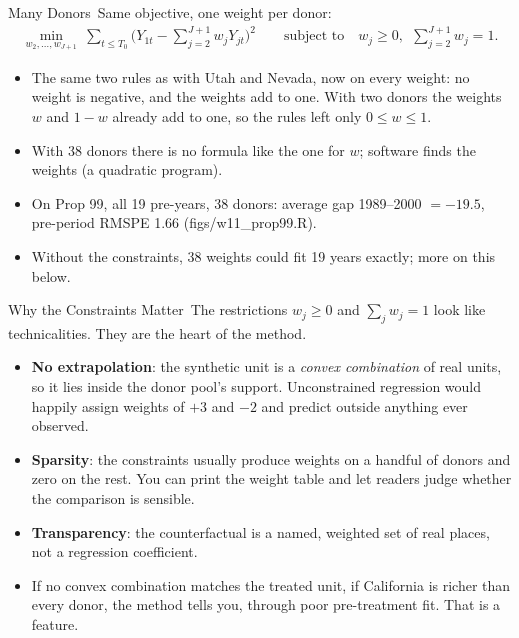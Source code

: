 \documentclass[aspectratio=169,11pt,xcolor=dvipsnames]{beamer}
\newcommand{\srcp}[1]{{\scriptsize\color{gray}(#1)}}
\newcommand{\core}{\,\raisebox{0.6pt}{\textcolor{corestar}{$\bigstar$}}}
\begin{document}
\begin{frame}{Many Donors\core}
Same objective, one weight per donor:
\begin{align*}
  \min_{w_2,\dots,w_{J+1}}\ \sum_{t \leq T_0}\Big(Y_{1t} - \sum_{j=2}^{J+1} w_j Y_{jt}\Big)^2
  \qquad\text{subject to}\quad w_j \geq 0,\ \ \sum_{j=2}^{J+1} w_j = 1 .
\end{align*}
\vskip3pt
\begin{itemize}\itemsep3pt
  \item The same two rules as with Utah and Nevada, now on every weight: no
        weight is negative, and the weights add to one. With two donors the
        weights $w$ and $1-w$ already add to one, so the rules left only
        $0 \leq w \leq 1$.
  \item With 38 donors there is no formula like the one for $w$; software
        finds the weights (a quadratic program).
  \item On Prop 99, all 19 pre-years, 38 donors: average gap 1989--2000 $= -19.5$,
        pre-period RMSPE 1.66 \srcp{figs/w11\_prop99.R}.
  \item Without the constraints, 38 weights could fit 19 years exactly; more on this
        below.
\end{itemize}
\end{frame}

\begin{frame}{Why the Constraints Matter\core}
The restrictions $w_j\geq 0$ and $\sum_j w_j = 1$ look like technicalities. They
are the heart of the method.
\vskip4pt
\begin{itemize}\itemsep3pt
  \item \textbf{No extrapolation}: the synthetic unit is a \emph{convex
        combination} of real units, so it lies inside the donor pool's support.
        Unconstrained regression would happily assign weights of $+3$ and $-2$ and
        predict outside anything ever observed.
  \item \textbf{Sparsity}: the constraints usually produce weights on a handful
        of donors and zero on the rest. You can print the weight table and let
        readers judge whether the comparison is sensible.
  \item \textbf{Transparency}: the counterfactual is a named, weighted set of real
        places, not a regression coefficient.
  \item If no convex combination matches the treated unit, if California is
        richer than every donor, \alert{the method tells you}, through poor
        pre-treatment fit. That is a feature.
\end{itemize}
\end{frame}
\end{document}
